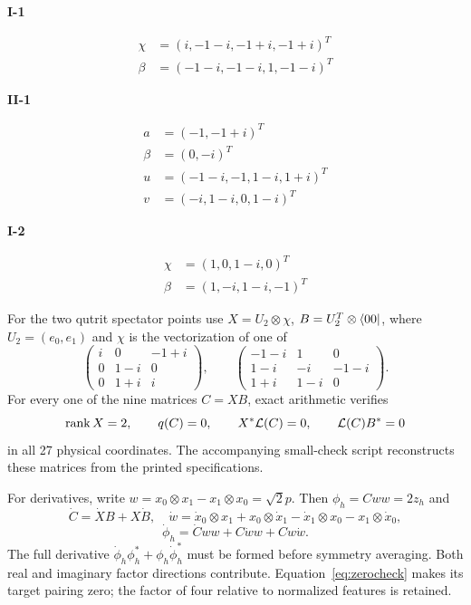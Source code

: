\documentclass[11pt,a4paper]{article}
\theoremstyle{definition}\newtheorem{definition}[theorem]{Definition}
\theoremstyle{remark}\newtheorem{remark}[theorem]{Remark}
\numberwithin{equation}{section}
\begin{document}
\noindent\textbf{I-1}\par
\begin{align*}
\chi&=(i,-1 - i,-1 + i,-1 + i)^T\\
\beta&=(-1 - i,-1 - i,1,-1 - i)^T
\end{align*}

\noindent\textbf{II-1}\par
\begin{align*}
a&=(-1,-1 + i)^T\\
\beta&=(0,- i)^T\\
u&=(-1 - i,-1,1 - i,1 + i)^T\\
v&=(- i,1 - i,0,1 - i)^T
\end{align*}

\noindent\textbf{I-2}\par
\begin{align*}
\chi&=(1,0,1 - i,0)^T\\
\beta&=(1,- i,1 - i,-1)^T
\end{align*}
\endgroup

For the two qutrit spectator points use
$X=U_2\otimes\chi$, $B=U_2^T\otimes\langle00|$,
where $U_2=(e_0,e_1)$ and $\chi$ is the vectorization of one of
\[
\begin{pmatrix}i&0&-1+i\\0&1-i&0\\0&1+i&i\end{pmatrix},
\qquad
\begin{pmatrix}-1-i&1&0\\1-i&-i&-1-i\\1+i&1-i&0\end{pmatrix}.
\]
For every one of the nine matrices $C=XB$, exact arithmetic verifies
\begin{equation}
\operatorname{rank} X=2,\qquad q(C)=0,\qquad
X^*\mathcal L(C)=0,\qquad \mathcal L(C)B^*=0
\label{eq:zerocheck}
\end{equation}
in all 27 physical coordinates. The accompanying small-check script
reconstructs these matrices from the printed specifications.

For derivatives, write $w=x_0\otimes x_1-x_1\otimes x_0=\sqrt2p$.
Then $\phi_h=Cww=2z_h$ and
\[
\dot C=\dot XB+X\dot B,\quad
\dot w=\dot x_0\otimes x_1+x_0\otimes\dot x_1
       -\dot x_1\otimes x_0-x_1\otimes\dot x_0,
\]
\[
\dot\phi_h=\dot Cww+C\dot ww+Cw\dot w.
\]
The full derivative $\dot\phi_h\phi_h^*+\phi_h\dot\phi_h^*$
must be formed before symmetry averaging. Both real and imaginary
factor directions contribute.
Equation~\eqref{eq:zerocheck} makes its target pairing zero; the
factor of four relative to normalized features is retained.
\end{document}
